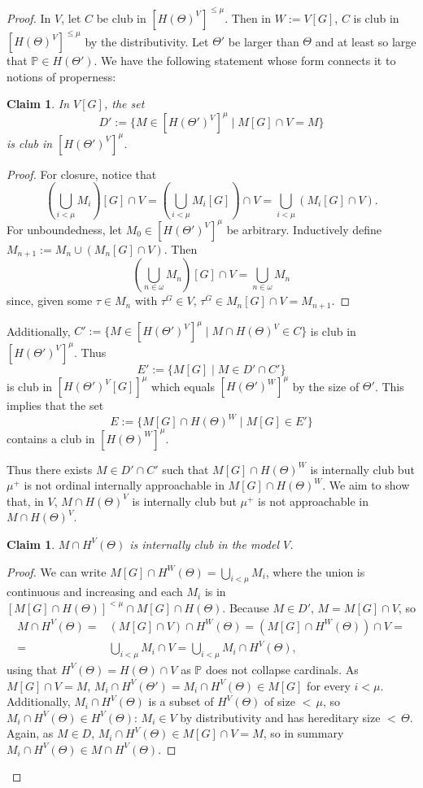 \documentclass[a4paper]{amsart}
\theoremstyle{definition}
\theoremstyle{remark}
\theoremstyle{plain}
\newtheorem{myclan}[mydef]{Claim}
\numberwithin{mydef}{section}
\newcommand{\dP}{\mathbb{P}}
\begin{document}
	\begin{proof}
		In $V$, let $C$ be club in $[H(\Theta)^V]^{\leq\mu}$. Then in $W:=V[G]$, $C$ is club in $[H(\Theta)^V]^{\leq\mu}$ by the distributivity. Let $\Theta'$ be larger than $\Theta$ and at least so large that $\dP\in H(\Theta')$. We have the following statement whose form connects it to notions of properness:
		\begin{myclan}
			In $V[G]$, the set
			$$D':=\{M\in[H(\Theta')^V]^{\mu}\;|\;M[G]\cap V=M\}$$
			is club in $[H(\Theta')^V]^{\mu}$.
		\end{myclan}
		\begin{proof}
			For closure, notice that
			$$\left(\bigcup_{i<\mu}M_i\right)[G]\cap V=\left(\bigcup_{i<\mu}M_i[G]\right)\cap V=\bigcup_{i<\mu}(M_i[G]\cap V).$$
			For unboundedness, let $M_0\in[H(\Theta')^V]^{\mu}$ be arbitrary. Inductively define $M_{n+1}:=M_n\cup (M_n[G]\cap V)$. Then
			$$\left(\bigcup_{n\in\omega}M_n\right)[G]\cap V=\bigcup_{n\in\omega}M_n$$
			since, given some $\tau\in M_n$ with $\tau^G\in V$, $\tau^G\in M_n[G]\cap V=M_{n+1}$.
		\end{proof}
		Additionally, $C':=\{M\in[H(\Theta')^V]^{\mu}\;|\;M\cap H(\Theta)^V \in C\}$ is club in $[H(\Theta')^V]^{\mu}$. Thus
		$$E':=\{M[G]\;|\;M\in D'\cap C'\}$$
		is club in $[H(\Theta')^V[G]]^{\mu}$ which equals $[H(\Theta')^W]^{\mu}$ by the size of $\Theta'$. This implies that the set
		$$E:=\{M[G]\cap H(\Theta)^W\;|\;M[G]\in E'\}$$
		contains a club in $[H(\Theta)^W]^{\mu}$.
		
		Thus there exists $M\in D'\cap C'$ such that $M[G]\cap H(\Theta)^W$ is internally club but $\mu^+$ is not ordinal internally approachable in $M[G]\cap H(\Theta)^W$. We aim to show that, in $V$, $M\cap H(\Theta)^V$ is internally club but $\mu^+$ is not approachable in $M\cap H(\Theta)^V$.
		
		\begin{myclan}
			$M\cap H^V(\Theta)$ is internally club in the model $V$.
		\end{myclan}
		
		\begin{proof}
			We can write $M[G]\cap H^W(\Theta)=\bigcup_{i<\mu}M_i$, where the union is continuous and increasing and each $M_i$ is in $[M[G]\cap H(\Theta)]^{<\mu}\cap M[G]\cap H(\Theta)$. Because $M\in D'$, $M=M[G]\cap V$, so
\begin{align*}
M\cap H^V(\Theta)= & (M[G]\cap V)\cap H^W(\Theta)=(M[G]\cap H^W(\Theta))\cap V = \\ = & \bigcup_{i<\mu}M_i\cap V=\bigcup_{i<\mu}M_i\cap H^V(\Theta),
\end{align*}
using that $H^V(\Theta)=H(\Theta)\cap V$ as $\dP$ does not collapse cardinals. As $M[G]\cap V=M$, $M_i\cap H^V(\Theta')=M_i\cap H^V(\Theta)\in M[G]$ for every $i<\mu$. Additionally, $M_i\cap H^V(\Theta)$ is a subset of $H^V(\Theta)$ of size ${<}\,\mu$, so $M_i\cap H^V(\Theta)\in H^V(\Theta)$: $M_i\in V$ by distributivity and has hereditary size ${<}\,\Theta$. Again, as $M\in D$, $M_i\cap H^V(\Theta)\in M[G]\cap V=M$, so in summary $M_i\cap H^V(\Theta)\in M\cap H^V(\Theta)$.
		\end{proof}
		

\end{proof}
\end{document}
